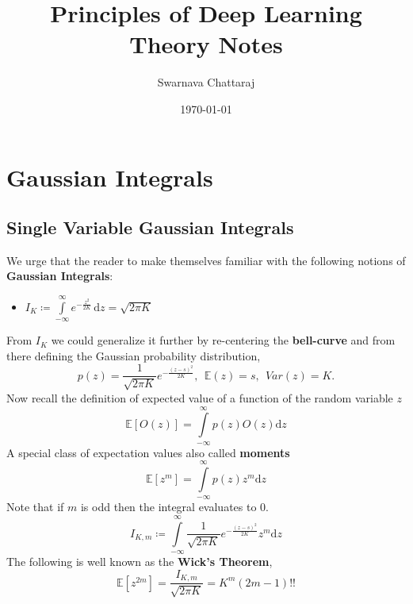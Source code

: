 \documentclass{scrartcl} %
\title{Principles of Deep Learning Theory Notes}
\author{Swarnava Chattaraj}
\date{\today}
\numberwithin{equation}{subsection}  %
\begin{document}
\maketitle

\section{Gaussian Integrals}
\subsection{Single Variable Gaussian Integrals}
We urge that the reader to make themselves familiar with the following notions of \textbf{Gaussian Integrals}:
\begin{itemize}
	\item $\displaystyle I_K \coloneqq \int\limits_{-\infty}^{\infty} e^{-\frac{z^2}{2K}} \,\mathrm{d}z = 
		\sqrt{2\pi K}$
\end{itemize}
From $I_K$ we could generalize it further by re-centering the \textbf{bell-curve} and from there defining the
Gaussian probability distribution,
\[
	p(z) = \dfrac{1}{\sqrt{2\pi K}}e^{-\frac{(z - s)^2}{2K}}, \ \ \mathbb{E}(z) = s, \ \ Var(z) = K.
\]
Now recall the definition of expected value of a function of the random variable $z$
\begin{equation}
	\mathbb{E}[O(z)] = \int\limits_{-\infty}^{\infty} p(z)O(z)\mathrm{d}z
\end{equation}
A special class of expectation values also called \textbf{moments}
\begin{equation}
	\mathbb{E}[z^m] = \int\limits_{-\infty}^{\infty} p(z)z^m\mathrm{d}z
\end{equation}
Note that if $m$ is odd then the integral evaluates to $0$.
\begin{equation}
	I_{K,m} \coloneqq  \int\limits_{-\infty}^{\infty} \dfrac{1}{\sqrt{2\pi K}}e^{-\frac{(z - s)^2}{2K}}
	z^m\mathrm{d}z	
\end{equation}
The following is well known as the \textbf{Wick's Theorem},
\begin{equation}
	\mathbb{E}[z^{2m}] = \dfrac{I_{K,m}}{\sqrt{2 \pi K}} = K^m(2m-1)!!
\end{equation}
\newpage
\end{document}
